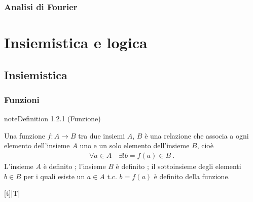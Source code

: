 \documentclass[letterpaper,10pt,italian]{jupyterBook}
\begin{document}
\section{Analisi di Fourier}
\label{\detokenize{ch/todo:analisi-di-fourier}}\label{\detokenize{ch/todo:math-hs-todo-fourier}}
\sphinxstepscope


\part{Insiemistica e logica}

\sphinxstepscope


\chapter{Insiemistica}
\label{\detokenize{ch/set:insiemistica}}\label{\detokenize{ch/set:math-hs-set}}\label{\detokenize{ch/set::doc}}

\section{}
\label{\detokenize{ch/set:id1}}

\section{Funzioni}
\label{\detokenize{ch/set:funzioni}}\label{\detokenize{ch/set:math-hs-fun}}\label{ch/set:set-fun-def}
\begin{sphinxadmonition}{note}{Definition 1.2.1 (Funzione)}



\sphinxAtStartPar
Una funzione \(f: A \rightarrow B\) tra due insiemi \(A\), \(B\) è una relazione che associa a ogni elemento dell’insieme \(A\) uno e un solo elemento dell’insieme \(B\), cioè
\begin{equation*}
\begin{split}\forall a \in A \quad \exists! b = f(a) \in B \ .\end{split}
\end{equation*}
\sphinxAtStartPar
L’insieme \(A\) è definito ; l’insieme \(B\) è definito ; il sottoinsieme degli elementi \(b \in B\) per i quali esiste un \(a \in A\) t.c. \(b = f(a)\) è definito  della funzione.
\end{sphinxadmonition}


\begin{savenotes}\sphinxattablestart
\centering
\begin{tabulary}{\linewidth}[t]{|T|}
\hline

\sphinxAtStartPar
{}
\\
\hline
\end{tabulary}
\par
\sphinxattableend\end{savenotes}
\end{document}
